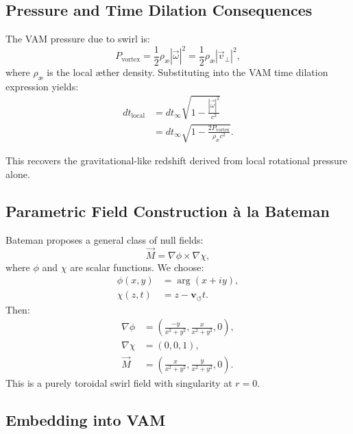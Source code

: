 \documentclass[12pt]{article}
\begin{document}
\subsection{Pressure and Time Dilation Consequences}

The VAM pressure due to swirl is:\cite{iskandarani2025swirlgravity}
\begin{equation}
    P_\text{vortex} = \frac{1}{2} \rho_\text{\ae} |\vec{\omega}|^2 = \frac{1}{2} \rho_\text{\ae} |\vec{v}_\perp|^2,
\end{equation}
where $\rho_\text{\ae}$ is the local æther density. Substituting into the VAM time dilation expression yields:
\begin{align}
    dt_\text{local} &= dt_\infty \sqrt{1 - \frac{|\vec{\omega}|^2}{c^2}} \\
    &= dt_\infty \sqrt{1 - \frac{2P_\text{vortex}}{\rho_\text{\ae} c^2}}. \label{eq:bateman_vam_dilation}
\end{align}

This recovers the gravitational-like redshift derived from local rotational pressure alone.

\subsection*{Parametric Field Construction \`a la Bateman}

Bateman proposes a general class of null fields:\cite{bateman1915aether}
\begin{equation}
    \vec{M} = \nabla \phi \times \nabla \chi, \label{eq:bateman_crossgrad}
\end{equation}
where $\phi$ and $\chi$ are scalar functions. We choose:
\begin{align}
    \phi(x,y) &= \arg(x + i y), \\
    \chi(z,t) &= z - \mathbf{v}_{\scriptscriptstyle\boldsymbol{\circlearrowleft}} t.
\end{align}
Then:
\begin{align}
    \nabla \phi &= \left(\frac{-y}{x^2 + y^2}, \frac{x}{x^2 + y^2}, 0\right), \\
    \nabla \chi &= (0, 0, 1), \\
    \vec{M} &= \left(\frac{x}{x^2 + y^2}, \frac{y}{x^2 + y^2}, 0\right).
\end{align}
This is a purely toroidal swirl field with singularity at $r=0$.

\subsection{Embedding into VAM}
\end{document}
